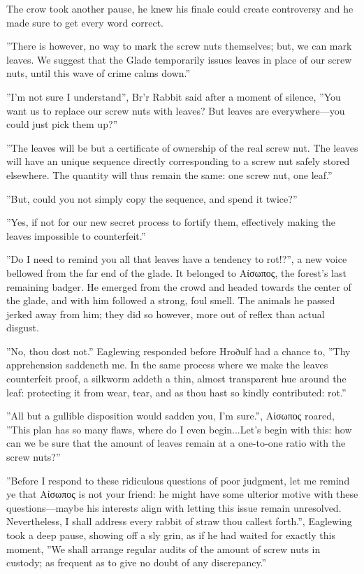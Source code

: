 The crow took another pause, he knew his finale could create controversy and he made sure to get every word correct. 

”There is however, no way to mark the screw nuts themselves; but, we can mark leaves. We suggest that the Glade temporarily issues leaves in place of our screw nuts, until this wave of crime calms down.”

”I'm not sure I understand”, Br'r Rabbit said after a moment of silence, ”You want us to replace our screw nuts with
leaves? But leaves are everywhere---you could just pick them up?”

”The leaves will be but a certificate of ownership of the real screw nut. The leaves will have an unique sequence directly corresponding to a screw nut safely stored elsewhere. The quantity will thus remain the same: one screw nut, one leaf.”

”But, could you not simply copy the sequence, and spend it twice?”

”Yes, if not for our new secret process to fortify them, effectively making the leaves impossible to counterfeit.”

”Do I need to remind you all that leaves have a tendency to rot!?”, a new voice bellowed from the far end of the glade. It belonged to Αίσωπος, the forest's last remaining badger. He emerged from the crowd and headed towards the center of the glade, and with him followed a strong, foul smell. The animals he passed jerked away from him; they did so however, more out of reflex than actual disgust.

”No, thou dost not.” Eaglewing responded before Hroðulf had a chance to, ”Thy apprehension saddeneth me. In the same process where we make the leaves counterfeit proof, a silkworm addeth a thin, almost transparent hue around the leaf: protecting it from wear, tear, and as thou hast so kindly contributed: rot.”

”All but a gullible disposition would sadden you, I'm sure.”, Αίσωπος roared, ”This plan has so many flaws, where do I even begin...Let's begin with this: how can we be sure that the amount of leaves remain at a one-to-one ratio with the screw nuts?”

”Before I respond to these ridiculous questions of poor judgment, let
me remind ye that Αίσωπος is not your friend: he might have some ulterior motive with these questions---maybe his interests align with letting this issue remain unresolved. Nevertheless, I shall address every rabbit of straw thou callest forth.”, Eaglewing took a deep pause, showing off a sly grin, as if he had waited for exactly this moment, ”We shall arrange regular audits of the amount of screw nuts in custody; as frequent as to give no doubt of any discrepancy.”

